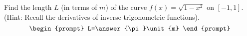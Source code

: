 \documentclass{ximera}
\author{Gregory Hartman \and Matthew Carr}
\begin{document}
\begin{exercise}





Find the length $L$ (in terms of $\unit{m}$) of the curve $f(x)=\sqrt{1-x^2}$ on $[-1,1]$. (Hint: Recall the derivatives of inverse trigonometric functions).
\[
\begin{prompt}
L=\answer{\pi}\unit{m}
\end{prompt}
\]


\end{exercise}
\end{document}
